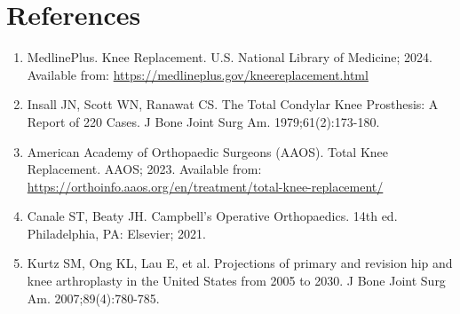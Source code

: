 \section*{References}
\begin{enumerate}
  \item MedlinePlus. Knee Replacement. U.S. National Library of Medicine; 2024. Available from: \url{https://medlineplus.gov/kneereplacement.html}
  
  \item Insall JN, Scott WN, Ranawat CS. The Total Condylar Knee Prosthesis: A Report of 220 Cases. J Bone Joint Surg Am. 1979;61(2):173-180.
  
  \item American Academy of Orthopaedic Surgeons (AAOS). Total Knee Replacement. AAOS; 2023. Available from: \url{https://orthoinfo.aaos.org/en/treatment/total-knee-replacement/}
  
  \item Canale ST, Beaty JH. Campbell's Operative Orthopaedics. 14th ed. Philadelphia, PA: Elsevier; 2021.
  
  \item Kurtz SM, Ong KL, Lau E, et al. Projections of primary and revision hip and knee arthroplasty in the United States from 2005 to 2030. J Bone Joint Surg Am. 2007;89(4):780-785.
\end{enumerate}

\clearpage
